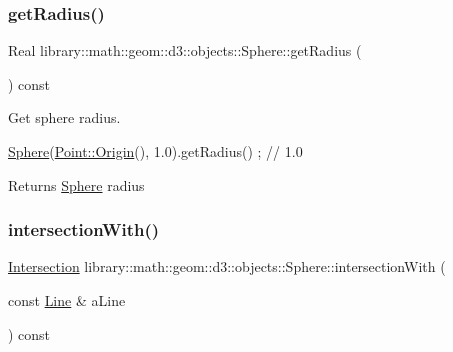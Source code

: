 \subsubsection{\texorpdfstring{get\+Radius()}{getRadius()}}
{\footnotesize\ttfamily Real library\+::math\+::geom\+::d3\+::objects\+::\+Sphere\+::get\+Radius (\begin{DoxyParamCaption}{ }\end{DoxyParamCaption}) const}



Get sphere radius. 


\begin{DoxyCode}
\hyperlink{classlibrary_1_1math_1_1geom_1_1d3_1_1objects_1_1_sphere_a55dccc8ea16ee55cd7694c26afa8ea39}{Sphere}(\hyperlink{classlibrary_1_1math_1_1geom_1_1d3_1_1objects_1_1_point_ab2a38e285c562e50bf350272c083986f}{Point::Origin}(), 1.0).getRadius() ; \textcolor{comment}{// 1.0}
\end{DoxyCode}


\begin{DoxyReturn}{Returns}
\hyperlink{classlibrary_1_1math_1_1geom_1_1d3_1_1objects_1_1_sphere}{Sphere} radius 
\end{DoxyReturn}
\mbox{\label{classlibrary_1_1math_1_1geom_1_1d3_1_1objects_1_1_sphere_a6cee64ab56c136802a08d7b5403b80ac}} 
\subsubsection{\texorpdfstring{intersection\+With()}{intersectionWith()}\hspace{0.1cm}{\footnotesize\ttfamily [1/5]}}
{\footnotesize\ttfamily \hyperlink{classlibrary_1_1math_1_1geom_1_1d3_1_1_intersection}{Intersection} library\+::math\+::geom\+::d3\+::objects\+::\+Sphere\+::intersection\+With (\begin{DoxyParamCaption}\item[{const \hyperlink{classlibrary_1_1math_1_1geom_1_1d3_1_1objects_1_1_line}{Line} \&}]{a\+Line }\end{DoxyParamCaption}) const}



